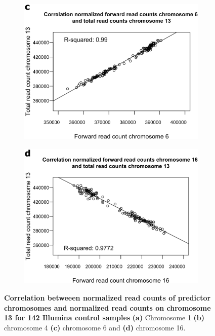 \begin{figure}[h]
\begin{subfigure}{.5\textwidth}
		\includegraphics[width=1\linewidth]{img/NIPT_Supp3_Fig3_2c}
		\label{fig:NIPT_Supp3_Fig3_2c}
	\end{subfigure} 
	\begin{subfigure}{.5\textwidth}
		\centering
		\includegraphics[width=1\linewidth]{img/NIPT_Supp3_Fig3_2d}
		\label{fig:NIPT_Supp3_Fig3_2d}
	\end{subfigure}  
	\caption[Correlation between normalized read counts of chromosomes]{\textbf{Correlation betweeen normalized read counts of predictor chromosomes and normalized read counts on chromosome 13 for 142 Illumina control samples} \textbf{(a)} Chromosome 1 \textbf{(b)} chromosome 4 \textbf{(c)} chromosome 6 and \textbf{(d)} chromosome 16.}
	\label{fig:NIPT_Supp3_Fig3_2}
\end{figure}



